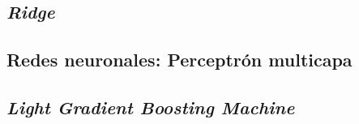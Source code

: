 \subsection{\textit{Ridge}}
\label{subsec:ridge_multi}



\subsection{Redes neuronales: Perceptrón multicapa}
\label{subsec:mlp_multi}



\subsection{\textit{Light Gradient Boosting Machine}}
\label{subsec:lgbm_multi}

